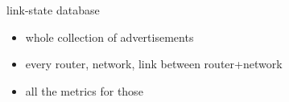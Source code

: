 \begin{frame}{link-state database}
    \begin{itemize}
    \item whole collection of advertisements
    \vspace{.5cm}
    \item every router, network, link between router+network
    \item all the metrics for those
    \end{itemize}
\end{frame}

